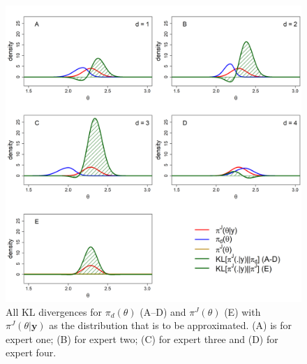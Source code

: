 \documentclass[openright,titlepage,12pt,a4paper]{book}
\begin{document}
\begin{figure}

{\centering \includegraphics[width=0.9\linewidth]{figures/chapter_3/Figure6} 

}

\caption{All KL divergences for $\pi_d(\theta)$ (A–D) and $\pi^J(\theta)$ (E) with $\pi^J(\theta|\textbf{y})$ as the distribution that is to be approximated. (A) is for expert one; (B) for expert two; (C) for expert three and (D) for expert four.}\label{fig:ch03fig6}
\end{figure}

\newpage
\end{document}
